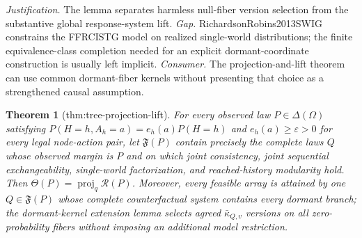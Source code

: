 \documentclass{article}
\newtheorem{theorem}{Theorem}
\begin{document}
\par\smallskip\noindent \textit{Justification.} The lemma separates harmless null-fiber version selection from the substantive global response-system lift. \textit{Gap.} RichardsonRobins2013SWIG constrains the FFRCISTG model on realized single-world distributions; the finite equivalence-class completion needed for an explicit dormant-coordinate construction is usually left implicit. \textit{Consumer.} The projection-and-lift theorem can use common dormant-fiber kernels without presenting that choice as a strengthened causal assumption.

\begin{theorem}[thm:tree-projection-lift]\label{thm:tree-projection-lift}
For every observed law \(P\in\Delta(\Omega)\) satisfying \(P(H=h,A_h=a)=e_h(a)P(H=h)\) and \(e_h(a)\geq\varepsilon>0\) for every legal node-action pair, let \(\mathfrak F(P)\) contain precisely the complete laws \(Q\) whose observed margin is \(P\) and on which joint consistency, joint sequential exchangeability, single-world factorization, and reached-history modularity hold. Then \(\Theta(P)=\operatorname{proj}_{q}\mathcal R(P)\). Moreover, every feasible array is attained by one \(Q\in\mathfrak F(P)\) whose complete counterfactual system contains every dormant branch; the dormant-kernel extension lemma selects agreed \(\bar\kappa_{Q,v}\) versions on all zero-probability fibers without imposing an additional model restriction.
\end{theorem}
\end{document}
